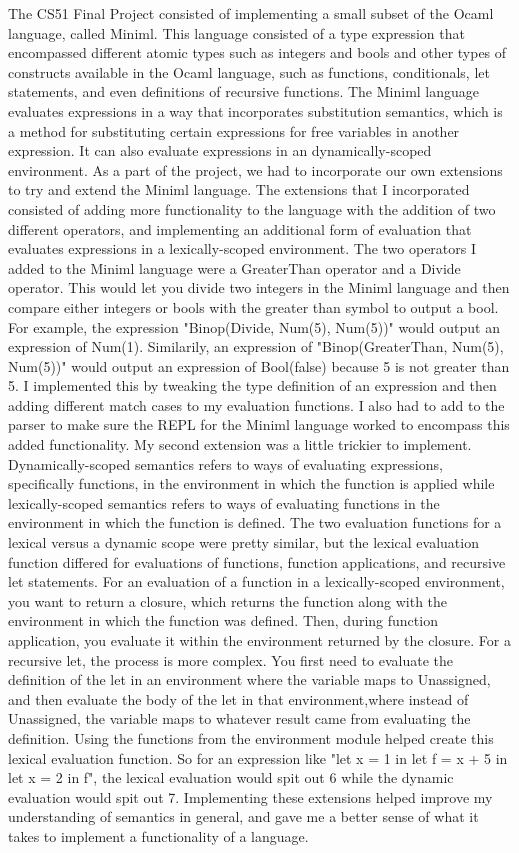       The CS51 Final Project consisted of implementing a small subset of the Ocaml language, called Miniml. 
This language consisted of a type expression that encompassed different atomic types such as integers and bools
and other types of constructs available in the Ocaml language, such as functions, conditionals, let statements, 
and even definitions of recursive functions. The Miniml language evaluates expressions in a way that incorporates 
substitution semantics, which is a method for substituting certain expressions for free variables in another
expression. It can also evaluate expressions in an dynamically-scoped environment. As a part of the project, we 
had to incorporate our own extensions to try and extend the Miniml language. The extensions that I incorporated 
consisted of adding more functionality to the language with the addition of two different operators, and 
implementing an additional form of evaluation that evaluates expressions in a lexically-scoped environment. 
      The two operators I added to the Miniml language were a GreaterThan operator and a Divide operator. This would 
let you divide two integers in the Miniml language and then compare either integers or bools with the greater than 
symbol to output a bool. For example, the expression "Binop(Divide, Num(5), Num(5))" would output an expression of Num(1). 
Similarily, an expression of "Binop(GreaterThan, Num(5), Num(5))" would output an expression of Bool(false) because 5 is 
not greater than 5. I implemented this by tweaking the type definition of an expression and then adding different match 
cases to my evaluation functions. I also had to add to the parser to make sure the REPL for the Miniml language worked 
to encompass this added functionality. 
      My second extension was a little trickier to implement. Dynamically-scoped semantics refers to ways of evaluating 
expressions, specifically functions, in the environment in which the function is applied while lexically-scoped semantics 
refers to ways of evaluating functions in the environment in which the function is defined. The two evaluation functions 
for a lexical versus a dynamic scope were pretty similar, but the lexical evaluation function differed for evaluations of 
functions, function applications, and recursive let statements. For an evaluation of a function in a lexically-scoped 
environment, you want to return a closure, which returns the function along with the environment in which the function was 
defined. Then, during function application, you evaluate it within the environment returned by the closure. For a recursive 
let, the process is more complex. You first need to evaluate the definition of the let in an environment where the variable 
maps to Unassigned, and then evaluate the body of the let in that environment,where instead of Unassigned, the variable maps 
to whatever result came from evaluating the definition. Using the functions from the environment module helped create this 
lexical evaluation function. So for an expression like "let x = 1 in let f = x + 5 in let x = 2 in f", the lexical evaluation 
would spit out 6 while the dynamic evaluation would spit out 7. Implementing these extensions helped improve my understanding 
of semantics in general, and gave me a better sense of what it takes to implement a functionality of a language. 

